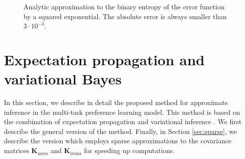 \documentclass{article}
\begin{document}
\begin{figure}
\centering

\caption{Analytic approximation to the binary entropy of the error function by a squared exponential.
The absolute error is always smaller than $3 \cdot 10^{-3}$. \label{fig:trick}}
\end{figure}

\section{Expectation propagation and variational Bayes\label{sec:EPinference}}

In this section, we describe in detail the proposed method for approximate inference in the multi-task preference learning model.
This method is based on the combination of expectation propagation \cite{Minka2002,gerven2010a}
and variational inference \cite{stern2009}. We first describe the general version of the method.
Finally, in Section \ref{sec:sparse}, we describe the version which employs sparse approximations to the covariance matrices $\mathbf{K}_\text{users}$
and $\mathbf{K}_\text{items}$ for speeding up computations.
\end{document}
